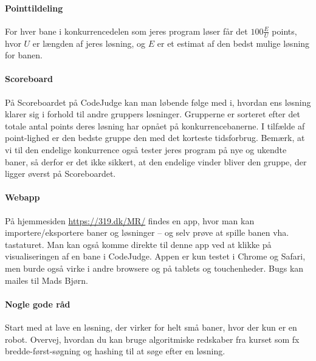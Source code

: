 \documentclass[10pt, a4paper]{article}
\begin{document}
\paragraph{Pointtildeling} For hver bane i konkurrencedelen som jeres program løser får det $100 \frac{E}{U}$ points, hvor $U$ er længden af jeres løsning, og $E$ er et estimat af den bedst mulige løsning for banen.

\paragraph{Scoreboard} På Scoreboardet på CodeJudge kan man løbende følge med i, hvordan ens løsning klarer sig i forhold til andre gruppers løsninger.
Grupperne er sorteret efter det totale antal points deres løsning har opnået på konkurrencebanerne.
I tilfælde af point-lighed er den bedste gruppe den med det korteste tidsforbrug.
Bemærk, at vi til den endelige konkurrence også tester jeres program på nye og ukendte baner, så derfor er det ikke sikkert, at den endelige vinder bliver den gruppe, der ligger øverst på Scoreboardet.

\paragraph{Webapp} På hjemmesiden \url{https://319.dk/MR/} findes en app, hvor man kan importere/eksportere baner og løsninger -- og selv prøve at spille banen vha. tastaturet. Man kan også komme direkte til denne app ved at klikke på visualiseringen af en bane i CodeJudge. Appen er kun testet i Chrome og Safari, men burde også virke i andre browsere og på tablets og touchenheder. Bugs kan mailes til Mads Bjørn.

\paragraph{Nogle gode råd} Start med at lave en løsning, der virker for helt små baner, hvor der kun er en robot. Overvej, hvordan du kan bruge algoritmiske redskaber fra kurset som fx bredde-først-søgning og hashing til at søge efter en løsning.
\end{document}
